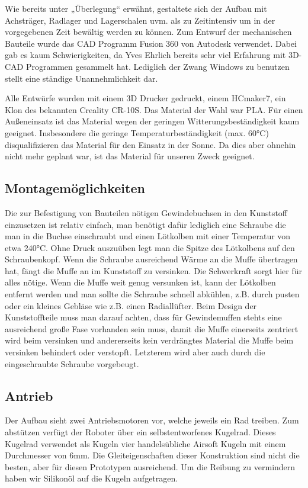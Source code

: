 \documentclass[12pt]{article}
\begin{document}
Wie bereits unter „Überlegung“ erwähnt, gestaltete sich der Aufbau mit Achsträger, Radlager und Lagerschalen uvm. als zu Zeitintensiv um in der vorgegebenen Zeit bewältig werden zu können.
Zum Entwurf der mechanischen Bauteile wurde das CAD Programm Fusion 360 von Autodesk verwendet. Dabei gab es kaum Schwierigkeiten, da Yves Ehrlich bereits sehr viel Erfahrung mit 3D-CAD Programmen gesammelt hat. Lediglich der Zwang Windows zu benutzen stellt eine ständige Unannehmlichkeit dar.

Alle Entwürfe wurden mit einem 3D Drucker gedruckt, einem HCmaker7, ein Klon des bekannten Creality CR-10S.
Das Material der Wahl war PLA. Für einen Außeneinsatz ist das Material wegen der geringen Witterungsbeständigkeit kaum geeignet. Insbesondere die geringe Temperaturbeständigkeit (max. 60°C) disqualifizieren das Material für den Einsatz in der Sonne. Da dies aber ohnehin nicht mehr geplant war, ist das Material für unseren Zweck geeignet.
\subsection{Montagemöglichkeiten}
Die zur Befestigung von Bauteilen nötigen Gewindebuchsen in den Kunststoff einzusetzen ist relativ einfach, man benötigt dafür lediglich eine Schraube die man in die Buchse einschraubt und einen Lötkolben mit einer Temperatur von etwa 240°C. Ohne Druck auszuüben legt man die Spitze des Lötkolbens auf den Schraubenkopf. Wenn die Schraube ausreichend Wärme an die Muffe übertragen hat, fängt die Muffe an im Kunststoff zu versinken. Die Schwerkraft sorgt hier für alles nötige. Wenn die Muffe weit genug versunken ist, kann der Lötkolben entfernt werden und man sollte die Schraube schnell abkühlen, z.B. durch pusten oder ein kleines Gebläse wie z.B. einen Radiallüfter.
Beim Design der Kunststoffteile muss man darauf achten, dass für Gewindemuffen stehts eine ausreichend große Fase vorhanden sein muss, damit die Muffe einerseits zentriert wird beim versinken und andererseits kein verdrängtes Material die Muffe beim versinken behindert oder verstopft. Letzterem wird aber auch durch die eingeschraubte Schraube vorgebeugt.
\subsection{Antrieb}
Der Aufbau sieht zwei Antriebsmotoren vor, welche jeweils ein Rad treiben. Zum abstützen verfügt der Roboter über ein selbstentworfenes Kugelrad. Dieses Kugelrad verwendet als Kugeln vier handelsübliche Airsoft Kugeln mit einem Durchmesser von 6mm.
Die Gleiteigenschaften dieser Konstruktion sind nicht die besten, aber für diesen Prototypen ausreichend. Um die Reibung zu vermindern haben wir Silikonöl auf die Kugeln aufgetragen.
\end{document}
